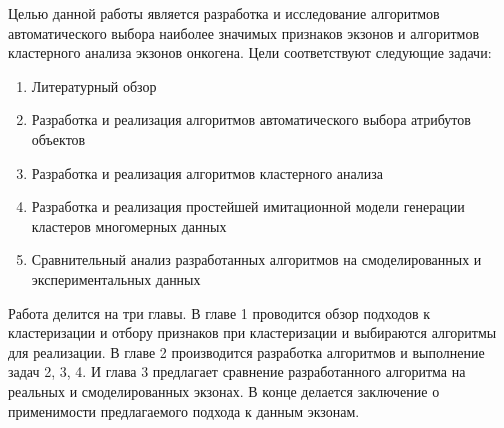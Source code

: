 Целью данной работы является разработка и исследование алгоритмов автоматического выбора наиболее значимых признаков экзонов и алгоритмов кластерного анализа экзонов онкогена. Цели соответствуют следующие задачи:
\begin{enumerate}
	\item Литературный обзор
	\item Разработка и реализация алгоритмов автоматического выбора атрибутов объектов
	\item Разработка и реализация алгоритмов кластерного анализа
	\item Разработка и реализация простейшей имитационной модели генерации кластеров многомерных данных
	\item Сравнительный анализ разработанных алгоритмов на смоделированных и экспериментальных данных
\end{enumerate}

Работа делится на три главы. В главе 1 проводится обзор подходов к кластеризации и отбору признаков при кластеризации и выбираются алгоритмы для реализации. В главе 2 производится разработка алгоритмов и выполнение задач 2, 3, 4. И глава 3 предлагает сравнение разработанного алгоритма на реальных и смоделированных экзонах. В конце делается заключение о применимости предлагаемого подхода к данным экзонам.
